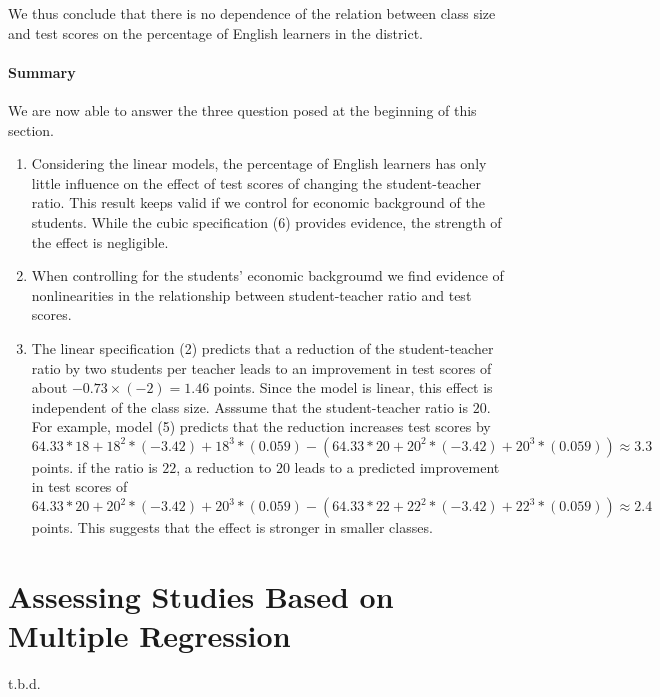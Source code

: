 \documentclass[]{book}
\theoremstyle{definition}
\theoremstyle{definition}
\theoremstyle{definition}
\theoremstyle{remark}
\begin{document}
We thus conclude that there is no dependence of the relation between
class size and test scores on the percentage of English learners in the
district.

\subsubsection*{Summary}\label{summary}

We are now able to answer the three question posed at the beginning of
this section.

\begin{enumerate}
\def\labelenumi{\arabic{enumi}.}
\item
  Considering the linear models, the percentage of English learners has
  only little influence on the effect of test scores of changing the
  student-teacher ratio. This result keeps valid if we control for
  economic background of the students. While the cubic specification (6)
  provides evidence, the strength of the effect is negligible.
\item
  When controlling for the students' economic backgroumd we find
  evidence of nonlinearities in the relationship between student-teacher
  ratio and test scores.
\item
  The linear specification (2) predicts that a reduction of the
  student-teacher ratio by two students per teacher leads to an
  improvement in test scores of about \(-0.73 \times (-2) = 1.46\)
  points. Since the model is linear, this effect is independent of the
  class size. Asssume that the student-teacher ratio is \(20\). For
  example, model (5) predicts that the reduction increases test scores
  by
  \[64.33*18+18^2*(-3.42)+18^3*(0.059) - (64.33*20+20^2*(-3.42)+20^3*(0.059)) \approx 3.3\]
  points. if the ratio is \(22\), a reduction to \(20\) leads to a
  predicted improvement in test scores of
  \[64.33*20+20^2*(-3.42)+20^3*(0.059) - (64.33*22+22^2*(-3.42)+22^3*(0.059)) \approx 2.4\]
  points. This suggests that the effect is stronger in smaller classes.
\end{enumerate}

\chapter{Assessing Studies Based on Multiple
Regression}\label{assessing-studies-based-on-multiple-regression}

t.b.d.


\end{document}
